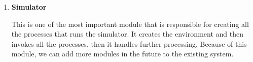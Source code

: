 \begin{enumerate}
\item \textbf{Simulator}

This is one of the most important module that is responsible for creating all the processes 
that runs the simulator. It creates the environment and then invokes all the processes, then it handles 
further processing. Because of this module, we can add more modules in the future to the existing system.

\end{enumerate}







